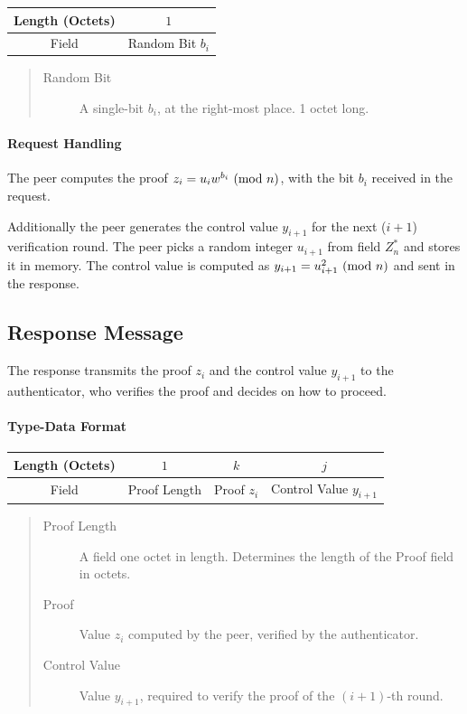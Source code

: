 \begin{center}
\begin{tabular}{|c|c|}
	\hline
	Length (Octets)  & $1$ \\
	\hline
	Field & Random Bit $b_i$\\
	\hline
\end{tabular}
\end{center}

\begin{quote}
\begin{description}
	\item[Random Bit] A single-bit $b_i$, at the right-most place. 1 octet long.
\end{description}
\end{quote}

\paragraph{Request Handling}
The peer computes the proof $z_i = u_iw^{b_i} \ (\mathrm{mod}\ n)$, with the bit $b_i$ received in the request.

Additionally the peer generates the control value $y_{i+1}$ for the next ($i+1$) verification round.
The peer picks a random integer $u_{i+1}$ from field $Z^*_n$ and stores it in memory.
The control value is computed as $y_{i+1} = u_{i+1}^2 \ (\mathrm{mod}\ n)$ and sent in the response.

\subsection*{Response Message}
The response transmits the proof $z_i$ and the control value $y_{i+1}$ to the authenticator, who verifies the proof and decides on how to proceed.

\paragraph{Type-Data Format}

\begin{center}
\begin{tabular}{|c|c|c|c|}
	\hline
	Length (Octets) & $1$ & $k $ & $j$\\
	\hline
	Field & Proof Length & Proof $z_i$ & Control Value $y_{i+1}$\\
	\hline
\end{tabular}
\end{center}

\begin{quote}
\begin{description}
	\item [Proof Length] A field one octet in length. Determines the length of the Proof field in octets.
	\item [Proof] Value $z_i$ computed by the peer, verified by the authenticator.
	\item [Control Value] Value $y_{i+1}$, required to verify the proof of the $(i+1)$-th round.
\end{description}
\end{quote}

